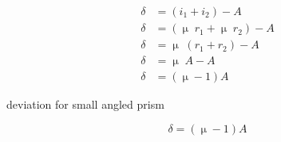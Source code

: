 \documentclass[12 pt]{book}
\newcommand*\Times{\fontfamily{ptm}\selectfont}
\newenvironment{my-title}
{
	\begin{center}
	\begin{itshape}
	\large\Times\textit{}
}
{
	\end{itshape}
	\end{center}
}
\newenvironment{note}
{
	\begin{center}
	\begin{itshape}
	\normalsize\Times\textit{}
}
{
	\end{itshape}
	\end{center}
}
\begin{document}
\pagebreak

\begin{note}
\begin{align*}
\delta &= (i_1 + i_2) - A \\[2 mm]
\delta &= (\upmu \; r_1 + \upmu \; r_2) - A \\[2 mm]
\delta &= \upmu \; (r_1 + r_2) - A \\[2 mm]
\delta &= \upmu \; A - A \\[2 mm]
\delta &= \left( \upmu - 1 \right) A 
\end{align*}
\end{note}

\begin{my-title}
deviation for small angled prism\\[-25 mm]
\end{my-title}
\[
\delta = \left( \upmu -1 \right) A
\]

\pagebreak
\end{document}
